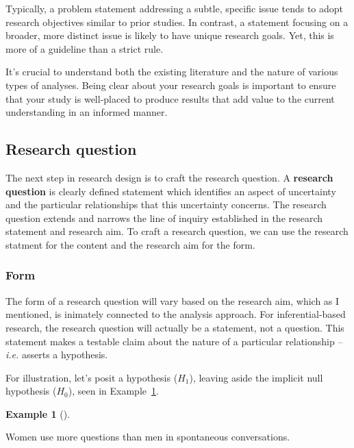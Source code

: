 \documentclass[
  letterpaper,
]{latex/krantz}
\theoremstyle{definition}
\newtheorem{example}{Example}[chapter]
\theoremstyle{remark}
\begin{document}
Typically, a problem statement addressing a subtle, specific issue tends
to adopt research objectives similar to prior studies. In contrast, a
statement focusing on a broader, more distinct issue is likely to have
unique research goals. Yet, this is more of a guideline than a strict
rule.

It's crucial to understand both the existing literature and the nature
of various types of analyses. Being clear about your research goals is
important to ensure that your study is well-placed to produce results
that add value to the current understanding in an informed manner.

\subsection{Research question}\label{sec-fr-question}

The next step in research design is to craft the research question. A
\textbf{research question} is clearly defined
statement which identifies an aspect of uncertainty and the particular
relationships that this uncertainty concerns. The research question
extends and narrows the line of inquiry established in the research
statement and research aim. To craft a research question, we can use the
research statment for the content and the research aim for the form.

\subsubsection{Form}\label{sec-fr-question-form}

The form of a research question will vary based on the research aim,
which as I mentioned, is inimately connected to the analysis approach.
For inferential-based research, the research question will actually be a
statement, not a question. This statement makes a testable claim about
the nature of a particular relationship --\emph{i.e.} asserts a
hypothesis.

For illustration, let's posit a hypothesis (\(H_1\)), leaving aside the
implicit null hypothesis (\(H_0\)), seen in
Example~\ref{exm-fr-form-infer}.

\begin{example}[]\protect\hypertarget{exm-fr-form-infer}{}\label{exm-fr-form-infer}

Women use more questions than men in spontaneous conversations.

\end{example}
\end{document}
